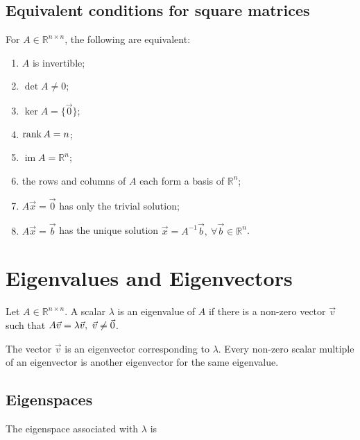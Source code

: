 \documentclass{article}
\begin{document}
\subsection{Equivalent conditions for square matrices}
For $A\in\mathbb{R}^{n\times n}$, the following are equivalent:

\begin{minipage}{0.3\textwidth}
    \begin{enumerate}
        \item $A$ is invertible;
        \item $\det A\neq0$;
        \item $\ker A=\{\vec{0}\}$;
        \item $\operatorname{rank} A=n$;
    \end{enumerate}
\end{minipage}
\begin{minipage}{0.7\textwidth}
    \begin{enumerate}
        \setcounter{enumi}{4}
        \item $\operatorname{im}A=\mathbb{R}^n$;
        \item the rows and columns of $A$ each form a basis of
                $\mathbb{R}^n$;
        \item $A\vec{x}=\vec{0}$ has only the trivial solution;
        \item $A\vec{x}=\vec{b}$ has the unique solution
                $\vec{x}=A^{-1}\vec{b},\ \forall\vec{b}\in\mathbb{R}^n$.
    \end{enumerate}
\end{minipage}

\section{Eigenvalues and Eigenvectors}
Let $A\in\mathbb{R}^{n\times n}$. A scalar $\lambda$ is an eigenvalue
of $A$ if there is a non-zero vector $\vec{v}$ such that $\dm A\vec{v}=\lambda\vec{v},\ \vec{v}\neq\vec{0}$.

The vector $\vec{v}$ is an eigenvector corresponding to $\lambda$.
Every non-zero scalar multiple of an eigenvector is another
eigenvector for the same eigenvalue.

\subsection{Eigenspaces}
The eigenspace associated with $\lambda$ is
    
\end{document}
